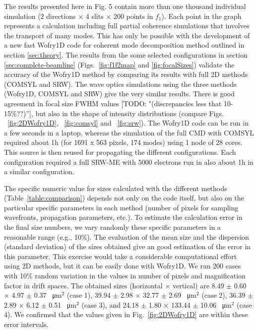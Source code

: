 \documentclass{iucr}              %
\newcommand{\todo}[1]{{\color{red}[TODO: "#1'']}}
\begin{document}
The results presented here in Fig. 5 contain more than one thousand individual simulation (2 directions $\times$ 4 slits $\times$ 200 points in $f_1$). Each point in the graph represents a calculation including full partial coherence simulations that involves the transport of many modes. This has only be possible with the development of a new fast Wofry1D code for coherent mode decomposition method outlined in section \ref{sec:theory}. The results from the some selected configurations in section \ref{sec:complete-beamline} (Figs.~\ref{fig:f1f2map} and \ref{fig:focalSizes}) validate the accuracy of the Wofry1D method by comparing its results with full 2D methods (COMSYL and SRW). The wave optics simulations using the three methods (Wofry1D, COMSYL and SRW) give the very similar results. 
There is good agreement in focal size FWHM values \todo{(discrepancies less that 10-15\%??)}, but also in the shape of intensity distributions (compare Figs. ~\ref{fig:2DWofry1D}, ~\ref{fig:comsyl} and ~\ref{fig:srw}). The Wofry1D code can be run in a few seconds in a laptop, whereas the simulation of the full CMD with COMSYL required about 1h (for 1691 x 563 pixels, 174 modes) using 1 node of 28 cores. This source is then reused for propagating the different configurations. Each configuration required a full SRW-ME with 5000 electrons run in also about 1h in a similar configuration. 

The specific numeric value for sizes calculated with the different methods (Table~\ref{table:comparison}) depends not only on the code itself, but also on the particular specific parameters in each method (number of pixels for sampling wavefronts, propagation parameters, etc.). To estimate the calculation error in the final size numbers, we vary randomly these specific parameters in a reasonable range (e.g., 10\%). The evaluation of the mean size and the dispersion (standard deviation) of the sizes obtained give an good estimation of the error in this parameter. This exercise would take a considerable computational effort using 2D methods, but it can be easily done with Wofry1D. We run 200 cases with 10\% random variation in the values in number of pixels and magnification factor in drift spaces. The obtained sizes (horizontal $\times$ vertical) are  
8.49 $\pm$ 0.60 $\times$ 4.97 $\pm$ 0.37 \SI{}{\micro\meter}$^2$ (case 1),
39.94 $\pm$ 2.98 $\times$ 32.77 $\pm$ 2.69 \SI{}{\micro\meter}$^2$ (case 2),
36.39 $\pm$ 2.89 $\times$ 6.12 $\pm$ 0.51 \SI{}{\micro\meter}$^2$ (case 3), and
24.18 $\pm$ 1.80 $\times$ 133.44 $\pm$ 10.06 \SI{}{\micro\meter}$^2$ (case 4). We confirmed that the values given in Fig.~\ref{fig:2DWofry1D} are within these error intervals.
\end{document}
